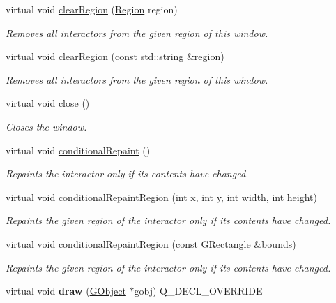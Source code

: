 \begin{DoxyCompactItemize}
virtual void \mbox{\hyperlink{classGWindow_a47f0cc45498a78757fa4d0e6befc2981}{clear\+Region}} (\mbox{\hyperlink{classGWindow_a81a01a86de31071a92e6cce0bab9bc4b}{Region}} region)
\begin{DoxyCompactList}\small\item\em Removes all interactors from the given region of this window. \end{DoxyCompactList}\item 
virtual void \mbox{\hyperlink{classGWindow_aeba526cb4d6d6f3d8d6f376656af8dc8}{clear\+Region}} (const std\+::string \&region)
\begin{DoxyCompactList}\small\item\em Removes all interactors from the given region of this window. \end{DoxyCompactList}\item 
virtual void \mbox{\hyperlink{classGWindow_a5ae591df94fc66ccb85cbb6565368bca}{close}} ()
\begin{DoxyCompactList}\small\item\em Closes the window. \end{DoxyCompactList}\item 
virtual void \mbox{\hyperlink{classGDrawingSurface_a221b3e75bb3d9d0bfea62b3364e6773b}{conditional\+Repaint}} ()
\begin{DoxyCompactList}\small\item\em Repaints the interactor only if its contents have changed. \end{DoxyCompactList}\item 
virtual void \mbox{\hyperlink{classGDrawingSurface_aedd4b792311d946eeaf44b0de337a408}{conditional\+Repaint\+Region}} (int x, int y, int width, int height)
\begin{DoxyCompactList}\small\item\em Repaints the given region of the interactor only if its contents have changed. \end{DoxyCompactList}\item 
virtual void \mbox{\hyperlink{classGDrawingSurface_a3932a12278752db368e24fa404e446aa}{conditional\+Repaint\+Region}} (const \mbox{\hyperlink{classGRectangle}{G\+Rectangle}} \&bounds)
\begin{DoxyCompactList}\small\item\em Repaints the given region of the interactor only if its contents have changed. \end{DoxyCompactList}\item 
virtual void {\bfseries draw} (\mbox{\hyperlink{classGObject}{G\+Object}} $\ast$gobj) Q\+\_\+\+D\+E\+C\+L\+\_\+\+O\+V\+E\+R\+R\+I\+DE

\end{DoxyCompactItemize}
